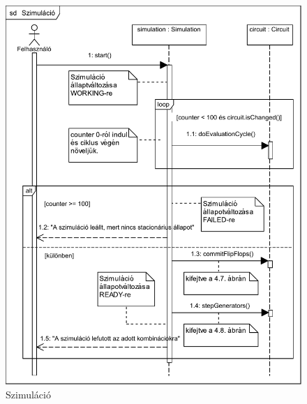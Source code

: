 \begin{figure}[H]
\begin{center}
\includegraphics{chapters/chapter04/seqdiagrams/new/simulation.pdf}
\caption{Szimuláció}
\label{fig:simulation}
\end{center}
\end{figure}


